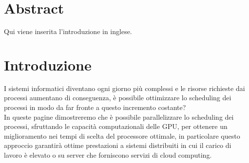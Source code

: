 \chapter{Abstract}
Qui viene inserita l'introduzione in inglese.

\chapter{Introduzione}
I sistemi informatici diventano ogni giorno più complessi e le risorse richieste dai processi aumentano di conseguenza, è possibile ottimizzare lo scheduling dei processi in modo da far fronte a questo incremento costante?\\
In queste pagine dimostreremo che è possibile parallelizzare lo scheduling dei processi, sfruttando le capacità computazionali delle GPU, per ottenere un miglioramento nei tempi di scelta del processore ottimale, in particolare questo approccio garantirà ottime prestazioni a sistemi distribuiti in cui il carico di lavoro è elevato o su server che forniscono servizi di cloud computing.
